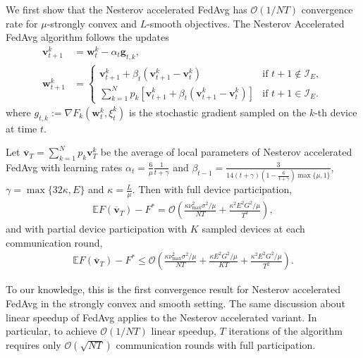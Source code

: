We first show that the Nesterov accelerated FedAvg has $\mathcal{O}(1/NT)$
convergence rate for $\mu$-strongly convex and $L$-smooth objectives.
The Nesterov Accelerated FedAvg algorithm follows the updates
\begin{align*}
\mathbf{v}_{t+1}^{k} & =\mathbf{w}_{t}^{k}-\alpha_{t}\mathbf{g}_{t,k},\\
\mathbf{w}_{t+1}^{k} & =\begin{cases}
\mathbf{v}_{t+1}^{k}+\beta_{t}(\mathbf{v}_{t+1}^{k}-\mathbf{v}_{t}^{k}) & \text{if }t+1\notin\mathcal{I}_{E},\\
\sum_{k=1}^{N}p_{k}\left[\mathbf{v}_{t+1}^{k}+\beta_{t}(\mathbf{v}_{t+1}^{k}-\mathbf{v}_{t}^{k})\right] & \text{if }t+1\in\mathcal{I}_{E}.
\end{cases}
\end{align*}
where $g_{t,k}:=\nabla F_{k}(\mathbf{w}_{t}^{k},\xi_{t}^{k})$ is
the stochastic gradient sampled on the $k$-th device at time $t$.  
\begin{theorem}
	\label{thm:nesterov_scvx}Let $\overline{\mathbf{v}}_{T}=\sum_{k=1}^{N}p_{k}\mathbf{v}_{T}^{k}$
	be the average of local parameters of Nesterov accelerated FedAvg
	with learning rates $\alpha_{t}=\frac{6}{\mu}\frac{1}{t+\gamma}$
	and $\beta_{t-1}=\frac{3}{14(t+\gamma)(1-\frac{6}{t+\gamma})\max\{\mu,1\}}$,
	$\gamma=\max\{32\kappa,E\}$ and $\kappa=\frac{L}{\mu}$. Then with
	full device participation, 
	\begin{align*}
	\mathbb{E}F(\overline{\mathbf{v}}_{T})-F^{\ast}=\mathcal{O}\left(\frac{\kappa\nu_{\max}^{2}\sigma^{2}/\mu}{NT}+\frac{\kappa^{2}E^{2}G^{2}/\mu}{T^{2}}\right),
	\end{align*}
	and with partial device participation with $K$ sampled devices at
	each communication round, 
	\begin{align*}
	\mathbb{E}F(\overline{\mathbf{v}}_{T})-F^{\ast}\leq\mathcal{O}\left(\frac{\kappa\nu_{\max}^{2}\sigma^{2}/\mu}{NT}+\frac{\kappa E^{2}G^{2}/\mu}{KT}+\frac{\kappa^{2}E^{2}G^{2}/\mu}{T^{2}}\right).
	\end{align*}
\end{theorem}
%
To our knowledge, this is the first convergence result for Nesterov
accelerated FedAvg in the strongly convex and smooth setting. The
same discussion about linear speedup of FedAvg applies to the Nesterov
accelerated variant. In particular, to achieve $\mathcal{O}(1/NT)$
linear speedup, $T$ iterations of the algorithm requires only $\mathcal{O}(\sqrt{NT})$
communication rounds with full participation. 


